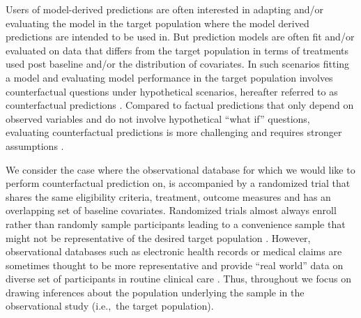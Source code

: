 \documentclass[11pt]{article}
\begin{document}
Users of model-derived predictions are often interested in adapting and/or evaluating the model in the target population where the model derived predictions are intended to be used in. But prediction models are often fit and/or evaluated on data that differs from the target population in terms of treatments used post baseline and/or the distribution of covariates. In such scenarios fitting a model and evaluating model performance in the target population involves counterfactual questions under hypothetical scenarios, hereafter referred to as counterfactual predictions 
\cite{van2020prediction,dickerman_counterfactual_2020,sperrin_using_2018,sperrin2019explicit, prosperi2020causal}. Compared to factual predictions that only depend on observed variables and do not involve hypothetical ``what if'' questions, evaluating counterfactual predictions is more challenging and requires stronger assumptions \cite{dickerman_predicting_2022, prosperi2020causal}.

We consider the case where the observational database for which we would like to perform counterfactual prediction on, is accompanied by a randomized trial that shares the same eligibility criteria, treatment, outcome measures and has an overlapping set of baseline covariates\cite{hernan2016using,matthews2021comparing,yiu2021randomized}. Randomized trials almost always enroll rather than randomly sample participants leading to a convenience sample that might not be representative of the desired target population \cite{antman1985selection,loree2019disparity,hutchins1999underrepresentation,unger2023lost}. However, observational databases such as electronic health records or medical claims are sometimes thought to be more representative and provide ``real world'' data on diverse set of participants in routine clinical care \cite{khozin2017real,colnet2020causal, forbes2020benchmarking}. Thus, throughout we focus on drawing inferences about the population underlying the sample in the observational study (i.e.,~the target population).
\end{document}
